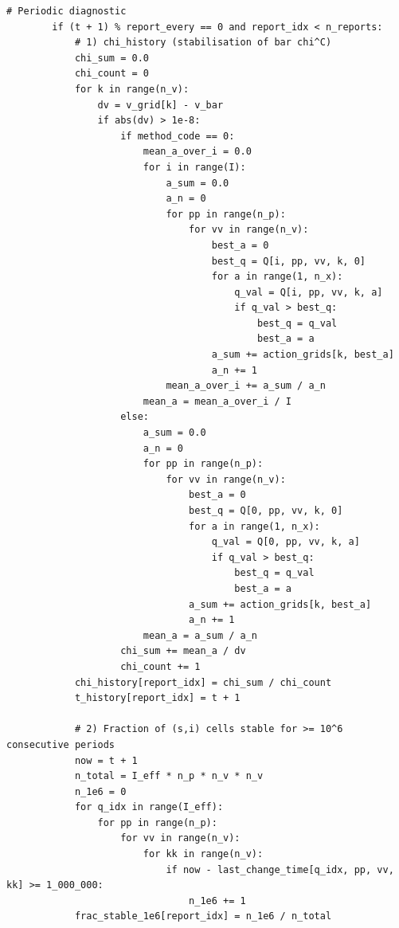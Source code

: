 \begin{lstlisting}[style=pythonstyle]
        # Periodic diagnostic
        if (t + 1) % report_every == 0 and report_idx < n_reports:
            # 1) chi_history (stabilisation of bar chi^C)
            chi_sum = 0.0
            chi_count = 0
            for k in range(n_v):
                dv = v_grid[k] - v_bar
                if abs(dv) > 1e-8:
                    if method_code == 0:
                        mean_a_over_i = 0.0
                        for i in range(I):
                            a_sum = 0.0
                            a_n = 0
                            for pp in range(n_p):
                                for vv in range(n_v):
                                    best_a = 0
                                    best_q = Q[i, pp, vv, k, 0]
                                    for a in range(1, n_x):
                                        q_val = Q[i, pp, vv, k, a]
                                        if q_val > best_q:
                                            best_q = q_val
                                            best_a = a
                                    a_sum += action_grids[k, best_a]
                                    a_n += 1
                            mean_a_over_i += a_sum / a_n
                        mean_a = mean_a_over_i / I
                    else:
                        a_sum = 0.0
                        a_n = 0
                        for pp in range(n_p):
                            for vv in range(n_v):
                                best_a = 0
                                best_q = Q[0, pp, vv, k, 0]
                                for a in range(1, n_x):
                                    q_val = Q[0, pp, vv, k, a]
                                    if q_val > best_q:
                                        best_q = q_val
                                        best_a = a
                                a_sum += action_grids[k, best_a]
                                a_n += 1
                        mean_a = a_sum / a_n
                    chi_sum += mean_a / dv
                    chi_count += 1
            chi_history[report_idx] = chi_sum / chi_count
            t_history[report_idx] = t + 1

            # 2) Fraction of (s,i) cells stable for >= 10^6 consecutive periods
            now = t + 1
            n_total = I_eff * n_p * n_v * n_v
            n_1e6 = 0
            for q_idx in range(I_eff):
                for pp in range(n_p):
                    for vv in range(n_v):
                        for kk in range(n_v):
                            if now - last_change_time[q_idx, pp, vv, kk] >= 1_000_000:
                                n_1e6 += 1
            frac_stable_1e6[report_idx] = n_1e6 / n_total


\end{lstlisting}
